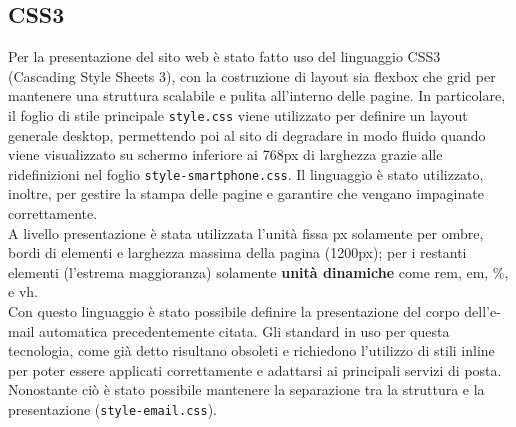 \documentclass[a4paper,10pt]{article}
\begin{document}
	\subsection{CSS3}
	Per la presentazione del sito web è stato fatto uso del linguaggio CSS3 (Cascading Style Sheets 3), con la costruzione di layout sia flexbox che grid per mantenere una struttura scalabile e pulita all'interno delle pagine. In particolare, il foglio di stile principale \texttt{style.css} viene utilizzato per definire un layout generale desktop, permettendo poi al sito di degradare in modo fluido quando viene visualizzato su schermo inferiore ai 768px di larghezza grazie alle ridefinizioni nel foglio \texttt{style-smartphone.css}. Il linguaggio è stato utilizzato, inoltre, per gestire la stampa delle pagine e garantire che vengano impaginate correttamente.\\
	A livello presentazione è stata utilizzata l'unità fissa px solamente per ombre, bordi di elementi e larghezza massima della pagina (1200px); per i restanti elementi (l'estrema maggioranza) solamente \textbf{unità dinamiche} come rem, em, \%, e vh.\\
	Con questo linguaggio è stato possibile definire la presentazione del corpo dell'e-mail automatica precedentemente citata. Gli standard in uso per questa tecnologia, come già detto risultano obsoleti e richiedono l'utilizzo di stili inline per poter essere applicati correttamente e adattarsi ai principali servizi di posta. Nonostante ciò è stato possibile mantenere la separazione tra la struttura e la presentazione (\texttt{style-email.css}).
\end{document}
